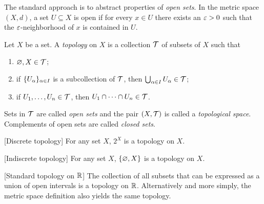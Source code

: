 The standard approach is to abstract properties of \emph{open sets}.
In the metric space $(X, d)$, a set $U \subseteq X$ is open if for every
$x \in U$ there exists an $\varepsilon > 0$ such that the $\varepsilon$-neighborhood
of $x$ is contained in $U$.
\begin{definition*} \label{def:topo}
    Let $X$ be a set.
    A \emph{topology} on $X$ is a collection $\mathcal{T}$ of subsets of $X$ such
    that
    \begin{enumerate}[label=(T\arabic*)]
        \item $\varnothing, X \in \mathcal{T}$;
        \item if $\{U_\alpha\}_{\alpha \in I}$ is a subcollection of
            $\mathcal{T}$, then $\bigcup_{\alpha \in I} U_\alpha \in \mathcal{T}$;
        \item if $U_1, \dots, U_n \in \mathcal{T}$, then $U_1 \cap \dots \cap U_n \in \mathcal{T}$.
    \end{enumerate}
    Sets in $\mathcal{T}$ are called \emph{open sets} and the pair $(X, \mathcal{T})$ is
    called a \emph{topological space}.
    Complements of open sets are called \emph{closed sets}.
\end{definition*}
\begin{examples}
    \item{} [Discrete topology] For any set $X$, $2^X$ is a topology on $X$.
    \item{} [Indiscrete topology] For any set $X$,
        $\{\varnothing, X\}$ is a topology on $X$.
    \item{} [Standard topology on $\mathbb{R}$] The collection of all
        subsets that can be expressed as a union of open intervals
        is a topology on $\mathbb{R}$.
        Alternatively and more simply, the metric space definition also
        yields the same topology.
\end{examples}
